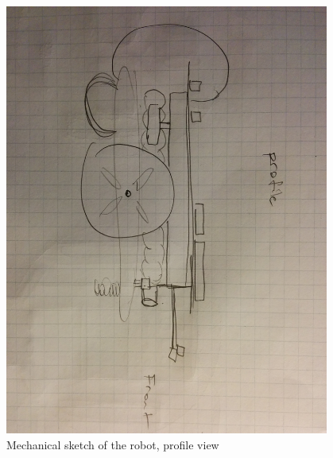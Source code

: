 \documentclass[12pt]{article}
\begin{document}
  \begin{figure}[b]
    \includegraphics[width=0.95\textwidth]{./img/mechanical-sketch-profile.jpg}
    \caption{Mechanical sketch of the robot, profile view}
    \label{fig:mechanical-sketch-profile}
  \end{figure}
\end{document}
